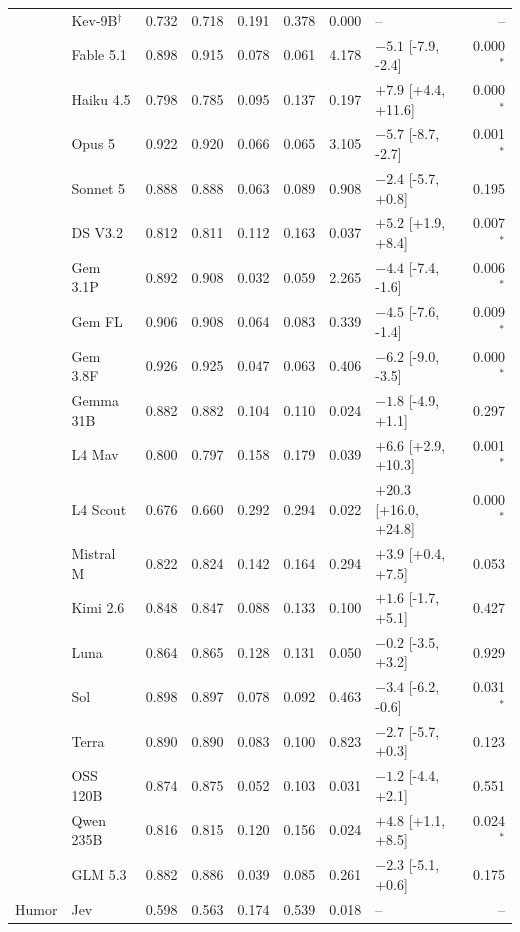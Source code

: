 \begin{longtable}{llrrrrrlr}
 & Kev-9B$^{\dagger}$ & 0.732 & 0.718 & 0.191 & 0.378 & 0.000 & -- & -- \\
 & Fable 5.1 & 0.898 & 0.915 & 0.078 & 0.061 & 4.178 & $-5.1$ [-7.9, -2.4] & 0.000$^{*}$ \\
 & Haiku 4.5 & 0.798 & 0.785 & 0.095 & 0.137 & 0.197 & $+7.9$ [+4.4, +11.6] & 0.000$^{*}$ \\
 & Opus 5 & 0.922 & 0.920 & 0.066 & 0.065 & 3.105 & $-5.7$ [-8.7, -2.7] & 0.001$^{*}$ \\
 & Sonnet 5 & 0.888 & 0.888 & 0.063 & 0.089 & 0.908 & $-2.4$ [-5.7, +0.8] & 0.195 \\
 & DS V3.2 & 0.812 & 0.811 & 0.112 & 0.163 & 0.037 & $+5.2$ [+1.9, +8.4] & 0.007$^{*}$ \\
 & Gem 3.1P & 0.892 & 0.908 & 0.032 & 0.059 & 2.265 & $-4.4$ [-7.4, -1.6] & 0.006$^{*}$ \\
 & Gem FL & 0.906 & 0.908 & 0.064 & 0.083 & 0.339 & $-4.5$ [-7.6, -1.4] & 0.009$^{*}$ \\
 & Gem 3.8F & 0.926 & 0.925 & 0.047 & 0.063 & 0.406 & $-6.2$ [-9.0, -3.5] & 0.000$^{*}$ \\
 & Gemma 31B & 0.882 & 0.882 & 0.104 & 0.110 & 0.024 & $-1.8$ [-4.9, +1.1] & 0.297 \\
 & L4 Mav & 0.800 & 0.797 & 0.158 & 0.179 & 0.039 & $+6.6$ [+2.9, +10.3] & 0.001$^{*}$ \\
 & L4 Scout & 0.676 & 0.660 & 0.292 & 0.294 & 0.022 & $+20.3$ [+16.0, +24.8] & 0.000$^{*}$ \\
 & Mistral M & 0.822 & 0.824 & 0.142 & 0.164 & 0.294 & $+3.9$ [+0.4, +7.5] & 0.053 \\
 & Kimi 2.6 & 0.848 & 0.847 & 0.088 & 0.133 & 0.100 & $+1.6$ [-1.7, +5.1] & 0.427 \\
 & Luna & 0.864 & 0.865 & 0.128 & 0.131 & 0.050 & $-0.2$ [-3.5, +3.2] & 0.929 \\
 & Sol & 0.898 & 0.897 & 0.078 & 0.092 & 0.463 & $-3.4$ [-6.2, -0.6] & 0.031$^{*}$ \\
 & Terra & 0.890 & 0.890 & 0.083 & 0.100 & 0.823 & $-2.7$ [-5.7, +0.3] & 0.123 \\
 & OSS 120B & 0.874 & 0.875 & 0.052 & 0.103 & 0.031 & $-1.2$ [-4.4, +2.1] & 0.551 \\
 & Qwen 235B & 0.816 & 0.815 & 0.120 & 0.156 & 0.024 & $+4.8$ [+1.1, +8.5] & 0.024$^{*}$ \\
 & GLM 5.3 & 0.882 & 0.886 & 0.039 & 0.085 & 0.261 & $-2.3$ [-5.1, +0.6] & 0.175 \\
\midrule
Humor & Jev & 0.598 & 0.563 & 0.174 & 0.539 & 0.018 & -- & -- \\

\end{longtable}
